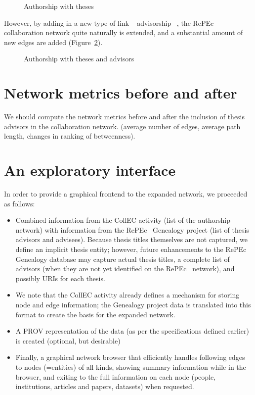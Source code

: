 \documentclass[x11names]{article}
\newcommand{\repec}{RePEc}
\begin{document}
\begin{figure}[ht]
\caption{Authorship with theses}\label{fig:author:theses}

\end{figure}

However, by adding in a new type of link -- advisorship --, the \repec~ collaboration network quite naturally is extended, and a substantial amount of new edges are added (Figure~\ref{fig:author:theses:complete}).
\begin{figure}[ht]
\caption{Authorship with theses and advisors}\label{fig:author:theses:complete}

\end{figure}

\clearpage

\section{Network metrics before and after}
\label{sec:metrics}

We should compute the network metrics before and after the inclusion of thesis advisors in the collaboration network. (average number of edges, average path length, changes in ranking of betweenness).
\clearpage
\section{An exploratory interface}
\label{sec:interface}
In order to provide a graphical frontend to the expanded network, we proceeded as follows:
\begin{itemize}
\item Combined information from the CollEC activity (list of the authorship network) with information from the \repec~ Genealogy project (list of thesis advisors and advisees). Because thesis titles themselves are not captured, we define an implicit thesis entity; however, future enhancements to the \repec~ Genealogy database may capture actual thesis titles, a complete list of advisors (when they are not yet identified on the \repec~ network), and possibly URIs for each thesis.
\item We note that the CollEC activity already defines a mechanism for storing node and edge information; the Genealogy project data is translated into this format to create the basis for the expanded network.
\item A PROV representation of the data (as per the specifications defined earlier) is created (optional, but desirable)
\item Finally, a graphical network browser that efficiently handles following edges to nodes (=entities) of all kinds, showing summary information while in the browser, and exiting to the full information on each node (people, institutions, articles and papers, datasets) when requested.
\end{itemize}
\end{document}
